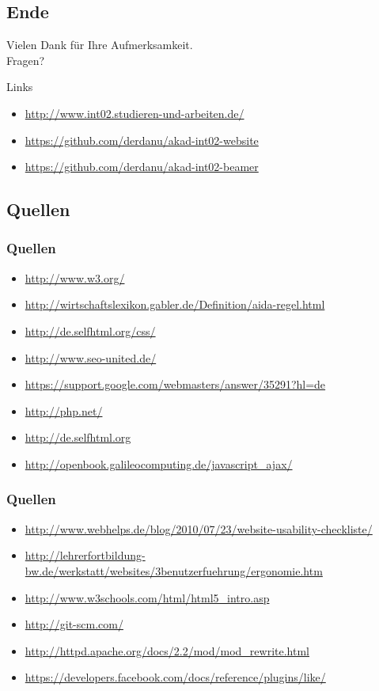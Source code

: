 \documentclass[xcolor=dvipsnames]{beamer}
\begin{document}
\subsection{Ende}
\begin{frame}
	\begin{block}{}	
		\begin{center}
			Vielen Dank für Ihre Aufmerksamkeit. \\
			Fragen?
		\end{center}	
	\end{block}
	\begin{block}{Links}	
		\begin{itemize}
			\item \url{http://www.int02.studieren-und-arbeiten.de/}
			\item \url{https://github.com/derdanu/akad-int02-website}
			\item \url{https://github.com/derdanu/akad-int02-beamer}						
		\end{itemize}
	\end{block}
\end{frame}

\subsection{Quellen}
\begin{frame} %
  \frametitle{Quellen} %
 	\begin{itemize}
		\item \url{http://www.w3.org/}
		\item \url{http://wirtschaftslexikon.gabler.de/Definition/aida-regel.html}
		\item \url{http://de.selfhtml.org/css/}
		\item \url{http://www.seo-united.de/}
		\item \url{https://support.google.com/webmasters/answer/35291?hl=de}		\item \url{http://php.net/}
 		\item \url{http://de.selfhtml.org}
		\item \url{http://openbook.galileocomputing.de/javascript_ajax/}
	\end{itemize}
\end{frame}

\begin{frame} %
  \frametitle{Quellen} %
 	\begin{itemize}
 		\item  \url{http://www.webhelps.de/blog/2010/07/23/website-usability-checkliste/}
		\item \url{http://lehrerfortbildung-bw.de/werkstatt/websites/3benutzerfuehrung/ergonomie.htm}
		\item \url{ http://www.w3schools.com/html/html5_intro.asp}
		\item \url{http://git-scm.com/}
		\item \url{http://httpd.apache.org/docs/2.2/mod/mod_rewrite.html}
		\item \url{https://developers.facebook.com/docs/reference/plugins/like/}
	\end{itemize}
\end{frame}
\end{document}
